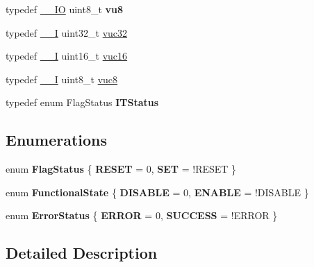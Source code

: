 \begin{DoxyCompactItemize}
\item 
\hypertarget{group___exported__types_ga4a8fa9a2b4796540a6d65a04eb18e111}{typedef \hyperlink{group___c_m_s_i_s__core__definitions_gaec43007d9998a0a0e01faede4133d6be}{\-\_\-\-\_\-\-I\-O} uint8\-\_\-t {\bfseries vu8}}\label{group___exported__types_ga4a8fa9a2b4796540a6d65a04eb18e111}

\item 
typedef \hyperlink{group___c_m_s_i_s__core__definitions_gaf63697ed9952cc71e1225efe205f6cd3}{\-\_\-\-\_\-\-I} uint32\-\_\-t \hyperlink{group___exported__types_ga2e08e321a35a55e72c5b3a507e76371f}{vuc32}
\item 
typedef \hyperlink{group___c_m_s_i_s__core__definitions_gaf63697ed9952cc71e1225efe205f6cd3}{\-\_\-\-\_\-\-I} uint16\-\_\-t \hyperlink{group___exported__types_ga7f6037565f0caa27727c8b871daf0d56}{vuc16}
\item 
typedef \hyperlink{group___c_m_s_i_s__core__definitions_gaf63697ed9952cc71e1225efe205f6cd3}{\-\_\-\-\_\-\-I} uint8\-\_\-t \hyperlink{group___exported__types_gab0ec90ac9b2c5864755998c8d37c264a}{vuc8}
\item 
\hypertarget{group___exported__types_gaacbd7ed539db0aacd973a0f6eca34074}{typedef enum Flag\-Status {\bfseries I\-T\-Status}}\label{group___exported__types_gaacbd7ed539db0aacd973a0f6eca34074}

\end{DoxyCompactItemize}
\subsection*{Enumerations}
\begin{DoxyCompactItemize}
\item 
enum {\bfseries Flag\-Status} \{ {\bfseries R\-E\-S\-E\-T} = 0, 
{\bfseries S\-E\-T} = !\-R\-E\-S\-E\-T
 \}
\item 
enum {\bfseries Functional\-State} \{ {\bfseries D\-I\-S\-A\-B\-L\-E} = 0, 
{\bfseries E\-N\-A\-B\-L\-E} = !\-D\-I\-S\-A\-B\-L\-E
 \}
\item 
enum {\bfseries Error\-Status} \{ {\bfseries E\-R\-R\-O\-R} = 0, 
{\bfseries S\-U\-C\-C\-E\-S\-S} = !\-E\-R\-R\-O\-R
 \}
\end{DoxyCompactItemize}


\subsection{Detailed Description}


